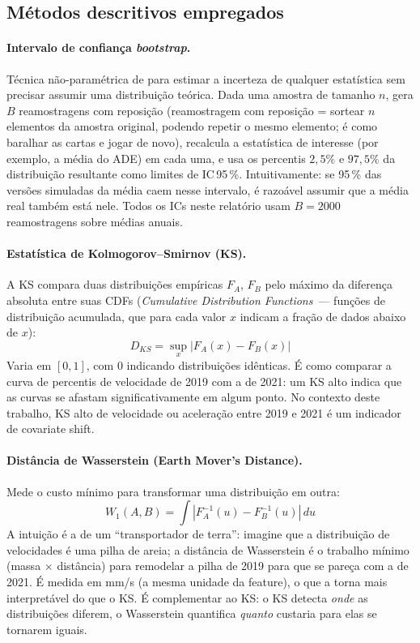\documentclass[11pt,a4paper]{article}
\begin{document}
\subsection{M\'etodos descritivos empregados}
\label{sec:m1_metodos}

\paragraph{Intervalo de confian\c{c}a \emph{bootstrap}.}
T\'ecnica n\~ao-param\'etrica de \citet{efron1979} para estimar a incerteza de qualquer estat\'istica sem precisar assumir uma distribui\c{c}\~ao te\'orica. Dada uma amostra de tamanho $n$, gera $B$ reamostragens com reposi\c{c}\~ao (reamostragem com reposi\c{c}\~ao = sortear $n$ elementos da amostra original, podendo repetir o mesmo elemento; \'e como baralhar as cartas e jogar de novo), recalcula a estat\'istica de interesse (por exemplo, a m\'edia do ADE) em cada uma, e usa os percentis $2{,}5\%$ e $97{,}5\%$ da distribui\c{c}\~ao resultante como limites de IC\,95\,\%. Intuitivamente: se 95\,\% das vers\~oes simuladas da m\'edia caem nesse intervalo, \'e razo\'avel assumir que a m\'edia real tamb\'em est\'a nele. Todos os ICs neste relat\'orio usam $B=2000$ reamostragens sobre m\'edias anuais.

\paragraph{Estat\'istica de Kolmogorov--Smirnov (KS).}
A KS \cite{kswin,gama2014} compara duas distribui\c{c}\~oes emp\'iricas $F_A$, $F_B$ pelo m\'aximo da diferen\c{c}a absoluta entre suas CDFs (\emph{Cumulative Distribution Functions}~--- fun\c{c}\~oes de distribui\c{c}\~ao acumulada, que para cada valor $x$ indicam a fra\c{c}\~ao de dados abaixo de $x$):
\[
D_{KS}=\sup_x |F_A(x) - F_B(x)|
\]
Varia em $[0,1]$, com $0$ indicando distribui\c{c}\~oes id\^enticas. \'E como comparar a curva de percentis de velocidade de 2019 com a de 2021: um KS alto indica que as curvas se afastam significativamente em algum ponto. No contexto deste trabalho, KS alto de velocidade ou acelera\c{c}\~ao entre 2019 e 2021 \'e um indicador de covariate shift.

\paragraph{Dist\^ancia de Wasserstein (Earth Mover's Distance).}
Mede o custo m\'inimo para transformar uma distribui\c{c}\~ao em outra:
\[
W_1(A,B)\!=\!\int|F_A^{-1}(u)\!-\!F_B^{-1}(u)|\,du
\]
A intui\c{c}\~ao \'e a de um ``transportador de terra'': imagine que a distribui\c{c}\~ao de velocidades \'e uma pilha de areia; a dist\^ancia de Wasserstein \'e o trabalho m\'inimo (massa $\times$ dist\^ancia) para remodelar a pilha de 2019 para que se pare\c{c}a com a de 2021. \'E medida em mm/s (a mesma unidade da feature), o que a torna mais interpret\'avel do que o KS. \'E complementar ao KS: o KS detecta \emph{onde} as distribui\c{c}\~oes diferem, o Wasserstein quantifica \emph{quanto} custaria para elas se tornarem iguais.
\end{document}
